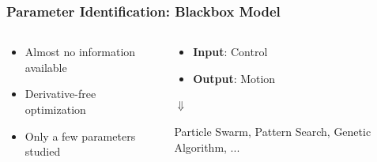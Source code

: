         
        
        
        
        
        
        
\begin{frame}        
    \frametitle{Parameter Identification: Blackbox Model}
    
    \begin{columns}[onlytextwidth]
        \begin{column}{0.5\textwidth}
        \begin{itemize}
        	\vspace{-1.5cm}
            \item{Almost no information available}
            \vspace{0.65cm}
            \item{Derivative-free optimization}
            \vspace{0.65cm}
            \item{Only a few parameters studied}
        \end{itemize}
        \end{column}
    
    
    
    \begin{column}{0.45\textwidth}
            \begin{exampleblock}{}
                \begin{itemize}
                
                \item{\textbf{Input}: Control}
                \item{\textbf{Output}: Motion}
                \end{itemize}
            \end{exampleblock}
            
            \centering
            $\Downarrow$
            
            \begin{exampleblock}{}
            Particle Swarm, Pattern Search, Genetic Algorithm, ...
            \end{exampleblock}
        \end{column}
      \end{columns}
\end{frame}



